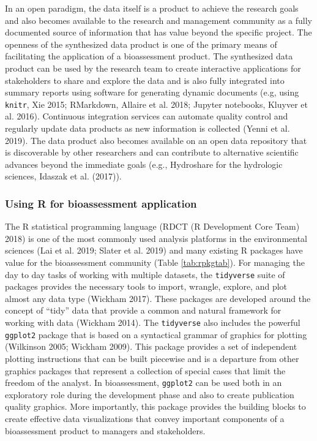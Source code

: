 \documentclass[fleqn,10pt,lineno]{wlpeerj} %
\begin{document}
In an open paradigm, the data itself is a product to achieve the research goals and also becomes available to the research and management community as a fully documented source of information that has value beyond the specific project. The openness of the synthesized data product is one of the primary means of facilitating the application of a bioassessment product. The synthesized data product can be used by the research team to create interactive applications for stakeholders to share and explore the data and is also fully integrated into summary reports using software for generating dynamic documents (e.g, using \texttt{knitr}, Xie 2015; RMarkdown, Allaire et al. 2018; Jupyter notebooks, Kluyver et al. 2016). Continuous integration services can automate quality control and regularly update data products as new information is collected (Yenni et al. 2019). The data product also becomes available on an open data repository that is discoverable by other researchers and can contribute to alternative scientific advances beyond the immediate goals (e.g., Hydroshare for the hydrologic sciences, Idaszak et al. (2017)).

\hypertarget{using-r-for-bioassessment-application}{%
\subsubsection{Using R for bioassessment application}\label{using-r-for-bioassessment-application}}

The R statistical programming language (RDCT (R Development Core Team) 2018) is one of the most commonly used analysis platforms in the environmental sciences (Lai et al. 2019; Slater et al. 2019) and many existing R packages have value for the bioassessment community (Table \ref{tab:rpkgtab}). For managing the day to day tasks of working with multiple datasets, the \texttt{tidyverse} suite of packages provides the necessary tools to import, wrangle, explore, and plot almost any data type (Wickham 2017). These packages are developed around the concept of ``tidy'' data that provide a common and natural framework for working with data (Wickham 2014). The \texttt{tidyverse} also includes the powerful \texttt{ggplot2} package that is based on a syntactical grammar of graphics for plotting (Wilkinson 2005; Wickham 2009). This package provides a set of independent plotting instructions that can be built piecewise and is a departure from other graphics packages that represent a collection of special cases that limit the freedom of the analyst. In bioassessment, \texttt{ggplot2} can be used both in an exploratory role during the development phase and also to create publication quality graphics. More importantly, this package provides the building blocks to create effective data visualizations that convey important components of a bioassessment product to managers and stakeholders.
\end{document}
